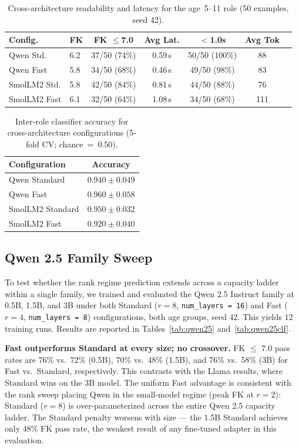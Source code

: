 \documentclass[journal]{IEEEtai}
\begin{document}
\begin{table}[!t]
  \centering
  \caption{Cross-architecture readability and latency for the age~5--11 role (50 examples, seed 42).}
  \label{tab:crossarch}
  \small
  \begin{tabular}{llccccc}
    \hline
    Config. & FK & FK $\leq$7.0 & Avg Lat. & $<$1.0s & Avg Tok \\
    \hline
    Qwen Std.    & 6.2 & 37/50 (74\%) & 0.59\,s & 50/50 (100\%) & 88 \\
    Qwen Fast    & 5.8 & 34/50 (68\%) & 0.46\,s & 49/50 (98\%)  & 83 \\
    SmolLM2 Std. & 5.8 & 42/50 (84\%) & 0.81\,s & 44/50 (88\%)  & 76 \\
    SmolLM2 Fast & 6.1 & 32/50 (64\%) & 1.08\,s & 34/50 (68\%)  & 111 \\
    \hline
  \end{tabular}
\end{table}

\begin{table}[!t]
  \centering
  \caption{Inter-role classifier accuracy for cross-architecture configurations (5-fold CV; chance~=~0.50).}
  \label{tab:crossarchclf}
  \small
  \begin{tabular}{lc}
    \hline
    Configuration    & Accuracy \\
    \hline
    Qwen Standard    & $0.940 \pm 0.049$ \\
    Qwen Fast        & $0.960 \pm 0.058$ \\
    SmolLM2 Standard & $0.950 \pm 0.032$ \\
    SmolLM2 Fast     & $0.920 \pm 0.040$ \\
    \hline
  \end{tabular}
\end{table}

\subsection{Qwen 2.5 Family Sweep}\label{sec:qwen25}

To test whether the rank regime prediction extends across a capacity ladder within a single family, we trained and evaluated the Qwen 2.5 Instruct family at 0.5B, 1.5B, and 3B under both Standard ($r=8$, \texttt{num\_layers~=~16}) and Fast ($r=4$, \texttt{num\_layers~=~8}) configurations, both age groups, seed 42. This yields 12 training runs. Results are reported in Tables~\ref{tab:qwen25} and~\ref{tab:qwen25clf}.

\textbf{Fast outperforms Standard at every size; no crossover.} FK $\leq$ 7.0 pass rates are 76\% vs.\ 72\% (0.5B), 70\% vs.\ 48\% (1.5B), and 76\% vs.\ 58\% (3B) for Fast vs.\ Standard, respectively. This contrasts with the Llama results, where Standard wins on the 3B model. The uniform Fast advantage is consistent with the rank sweep placing Qwen in the small-model regime (peak FK at $r=2$): Standard ($r=8$) is over-parameterized across the entire Qwen 2.5 capacity ladder. The Standard penalty worsens with size --- the 1.5B Standard achieves only 48\% FK pass rate, the weakest result of any fine-tuned adapter in this evaluation.
\end{document}
